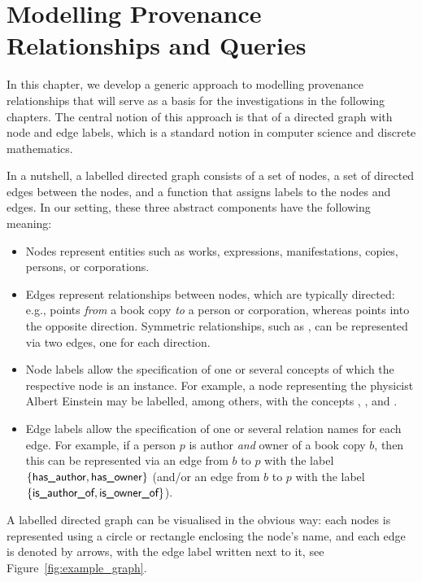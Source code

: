 
\chapter{Modelling Provenance Relationships and Queries}

In this chapter, we develop a generic approach to modelling provenance relationships
that will serve as a basis for the investigations in the following chapters.
The central notion of this approach is that of a directed graph with node and edge labels,
which is a standard notion in computer science and discrete mathematics.

In a nutshell, a labelled directed graph consists of a set of nodes, a set of directed edges between
the nodes, and a function that assigns labels to the nodes and edges.
In our setting, these three abstract components have the following meaning:
%
\begin{itemize}
  \item 
    Nodes represent entities such as works, expressions, manifestations, copies,
    persons, or corporations.
  \item 
    Edges represent relationships between nodes, which are typically directed:
    e.g.,  points \emph{from} a book copy \emph{to} a person or corporation,
    whereas  points into the opposite direction.
    Symmetric relationships, such as ,
    can be represented via two edges, one for each direction.
  \item 
    Node labels allow the specification of one or several concepts
    of which the respective node is an instance.
    For example, a node representing the physicist Albert Einstein
    may be labelled, among others, with the concepts , ,
    and .
  \item 
    Edge labels allow the specification of one or several relation names for each edge.
    For example, if a person $p$ is author \emph{and} owner of a book copy $b$,
    then this can be represented via an edge from $b$ to $p$ with the label
    $\{\textsf{has\_author},\textsf{has\_owner}\}$
    (and/or an edge from $b$ to $p$ with the label $\{\textsf{is\_author\_of},\textsf{is\_owner\_of}\}$).
\end{itemize}
%
A labelled directed graph can be visualised in the obvious way:
each nodes is represented using a circle or rectangle
enclosing the node's name,
and each edge is denoted by arrows, with the edge label written next to it,
see Figure~\ref{fig:example_graph}.

